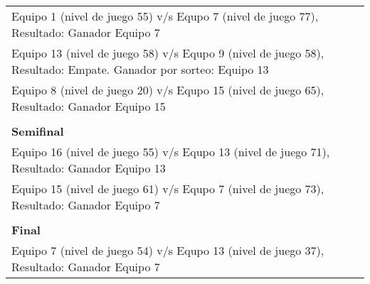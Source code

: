 \documentclass[10pt]{article}
\begin{document}
\begin{enumerate}
{\begin{table}[H]
\begin{center}
{\begin{tabular}{l}
                Equipo 1 (nivel de juego 55) v/s Equpo 7 (nivel de juego 77), Resultado: Ganador Equipo 7 \\
                Equipo 13 (nivel de juego 58) v/s Equpo 9 (nivel de juego 58), Resultado: Empate. Ganador por sorteo: Equipo 13 \\
                Equipo 8 (nivel de juego 20) v/s Equpo 15 (nivel de juego 65), Resultado: Ganador Equipo 15 \\ \\
                \textbf{Semifinal} \\
                Equipo 16 (nivel de juego 55) v/s Equpo 13  (nivel de juego 71), Resultado: Ganador Equipo 13 \\
                Equipo 15 (nivel de juego 61) v/s Equpo 7 (nivel de juego 73), Resultado: Ganador Equipo 7 \\ \\
                \textbf{Final} \\
                Equipo 7 (nivel de juego 54) v/s Equpo 13  (nivel de juego 37), Resultado: Ganador Equipo 7 \\
            \end{tabular}}
        \end{center}
    \end{table}
}
\end{enumerate}
\end{document}
